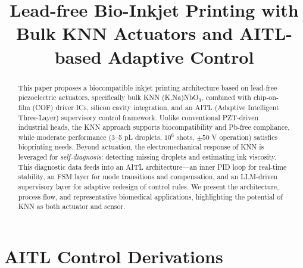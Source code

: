 \documentclass[conference]{IEEEtran}
\title{Lead-free Bio-Inkjet Printing with Bulk KNN Actuators and AITL-based Adaptive Control}
\author{%
  \IEEEauthorblockN{Shinichi Samizo}
  \IEEEauthorblockA{Independent Semiconductor Researcher\\
  Former Engineer at Seiko Epson Corporation\\
  Email: \href{mailto:shin3t72@gmail.com}{shin3t72@gmail.com}\\
  GitHub: \url{https://github.com/Samizo-AITL}}%
}
\begin{document}
\maketitle

\begin{abstract}
This paper proposes a biocompatible inkjet printing architecture based on
lead-free piezoelectric actuators, specifically bulk KNN (K,Na)NbO$_3$, combined
with chip-on-film (COF) driver ICs, silicon cavity integration, and
an AITL (Adaptive Intelligent Three-Layer) supervisory control framework.
Unlike conventional PZT-driven industrial heads, the KNN approach supports
biocompatibility and Pb-free compliance, while moderate performance
(3--5 pL droplets, $10^6$ shots, $\pm50$ V operation) satisfies bioprinting needs.
Beyond actuation, the electromechanical response of KNN is leveraged for
\emph{self-diagnosis}: detecting missing droplets and estimating ink viscosity.
This diagnostic data feeds into an AITL architecture---an inner PID loop for
real-time stability, an FSM layer for mode transitions and compensation,
and an LLM-driven supervisory layer for adaptive redesign of control rules.
We present the architecture, process flow, and representative biomedical
applications, highlighting the potential of KNN as both actuator and sensor.
\end{abstract}










\vspace{1em}

\appendices
\section{AITL Control Derivations}

\end{document}
